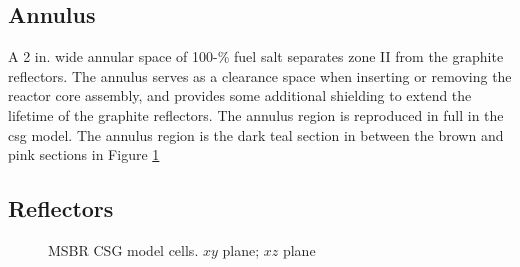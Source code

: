 \subsection{Annulus}
A 2 in. wide annular space of 100-\% fuel salt separates zone II from the
graphite reflectors. The annulus serves as a clearance space when inserting or
removing the reactor core assembly, and provides some additional shielding to
extend the lifetime of the graphite reflectors\cite{robertson_conceptual_1971}. The annulus region is reproduced in full in the \Gls{csg} model. The annulus region is the dark teal section in between the brown and pink sections in Figure \ref{fig:msbr-cells}

\subsection{Reflectors}
\begin{figure}[htpb]
    \centering
    \caption[MSBR CSG model cells]{MSBR CSG model cells.
         $xy$ plane; 
         $xz$ plane} 
    \label{fig:msbr-cells}
\end{figure}
